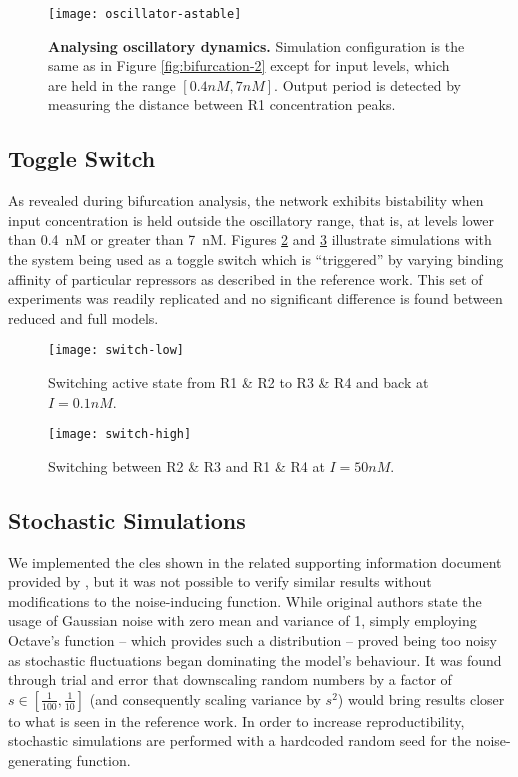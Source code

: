     \begin{figure}[!htb]
      \centering
      \texttt{[image: oscillator-astable]}
      \caption{\textbf{Analysing oscillatory dynamics.} Simulation configuration is the same as in Figure \ref{fig:bifurcation-2} except for input levels, which are held in the range $[0.4 nM, 7 nM]$. Output period is detected by measuring the distance between R1 concentration peaks.}
      \label{fig:oscillator-astable}
    \end{figure}


  \subsection{Toggle Switch}

    As revealed during bifurcation analysis, the network exhibits bistability when input concentration is held outside the oscillatory range, that is, at levels lower than \SI{0.4}{\nano M} or greater than \SI{7}{\nano M}.
    Figures \ref{fig:switch-low} and \ref{fig:switch-high} illustrate simulations with the system being used as a toggle switch which is ``triggered'' by varying binding affinity of particular repressors as described in the reference work.
    This set of experiments was readily replicated and no significant difference is found between reduced and full models.

    \begin{figure}[!htb]
      \centering
      \texttt{[image: switch-low]}
      \caption{Switching active state from R1 \& R2 to R3 \& R4 and back at $I = 0.1 nM$.}
      \label{fig:switch-low}
    \end{figure}

    \begin{figure}[!htb]
      \centering
      \texttt{[image: switch-high]}
      \caption{Switching between R2 \& R3 and R1 \& R4 at $I = 50 nM$.}
      \label{fig:switch-high}
    \end{figure}


  \subsection{Stochastic Simulations}

    We implemented the \ac{cles} shown in the related supporting information document provided by \citet{multif}, but it was not possible to verify similar results without modifications to the noise-inducing function.
    While original authors state the usage of Gaussian noise with zero mean and variance of 1, simply employing Octave's  function -- which provides such a distribution \cite{randn} -- proved being too noisy as stochastic fluctuations began dominating the model's behaviour.
    It was found through trial and error that downscaling random numbers by a factor of $s \in [\frac{1}{100}, \frac{1}{10}]$ (and consequently scaling variance by $s^2$) would bring results closer to what is seen in the reference work.
    In order to increase reproductibility, stochastic simulations are performed with a hardcoded random seed for the noise-generating function.

